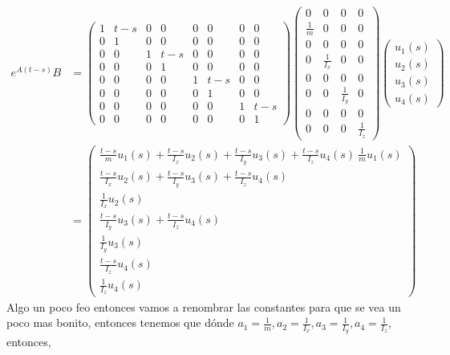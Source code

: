 \documentclass{uofa-eng-assignment}
\begin{document}
\begin{align*}
    e^{A(t-s)} B &= \left(\begin{matrix}
1 & t-s & 0 & 0 & 0 & 0 & 0 & 0 \\
0 & 1 & 0 & 0 & 0 & 0 & 0 & 0 \\
0 & 0 & 1 & t-s & 0 & 0 & 0 & 0 \\
0 & 0 & 0 & 1 & 0 & 0 & 0 & 0 \\
0 & 0 & 0 & 0 & 1 & t-s & 0 & 0 \\
0 & 0 & 0 & 0 & 0 & 1 & 0 & 0 \\
0 & 0 & 0 & 0 & 0 & 0 & 1 & t-s \\
0 & 0 & 0 & 0 & 0 & 0 & 0 & 1
\end{matrix}\right)
\left(\begin{matrix}
0 & 0 & 0 & 0 \\
\frac{1}{m} & 0 & 0 & 0 \\
0 & 0 & 0 & 0 \\
0 & \frac{1}{I_x} & 0 & 0 \\
0 & 0 & 0 & 0 \\
0 & 0 & \frac{1}{I_y} & 0 \\
0 & 0 & 0 & 0 \\
0 & 0 & 0 & \frac{1}{I_z}
\end{matrix}\right) 
\left(\begin{matrix}
u_1(s) \\
u_2(s) \\
u_3(s) \\
u_4(s)
\end{matrix}\right)
\\
&= \left(\begin{matrix}
\frac{t-s}{m} u_1(s) + \frac{t-s}{I_x} u_2(s) + \frac{t-s}{I_y} u_3(s) + \frac{t-s}{I_z} u_4(s) \
\frac{1}{m} u_1(s) \\
\frac{t-s}{I_x} u_2(s) + \frac{t-s}{I_y} u_3(s) + \frac{t-s}{I_z} u_4(s) \\
\frac{1}{I_x} u_2(s) \\
\frac{t-s}{I_y} u_3(s) + \frac{ t-s}{I_z} u_4(s) \\
\frac{1}{I_y} u_3(s) \\
\frac{t-s}{I_z} u_4(s) \\
\frac{1}{I_z} u_4(s)
\end{matrix}\right) 
\end{align*}
Algo un poco feo entonces vamos a renombrar las constantes para que se vea un poco mas bonito, entonces tenemos que dónde $a_1=\frac{1}{m}, a_2=\frac{1}{I_x}, a_3=\frac{1}{I_y}, a_4=\frac{1}{I_z}$, entonces,
\end{document}
